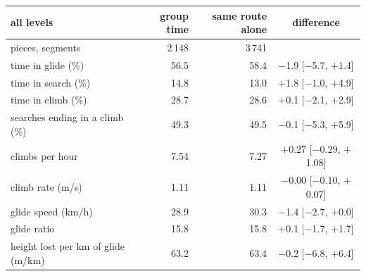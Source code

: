 \begin{tabular}{@{}l r r c@{}}
\toprule
all levels & group time & same route alone & difference \\
\midrule
pieces, segments & 2\,148 & 3\,741 & \\
time in glide (\%) & 56.5 & 58.4 & $-$1.9 [$-$5.7, $+$1.4] \\
time in search (\%) & 14.8 & 13.0 & $+$1.8 [$-$1.0, $+$4.9] \\
time in climb (\%) & 28.7 & 28.6 & $+$0.1 [$-$2.1, $+$2.9] \\
searches ending in a climb (\%) & 49.3 & 49.5 & $-$0.1 [$-$5.3, $+$5.9] \\
climbs per hour & 7.54 & 7.27 & $+$0.27 [$-$0.29, $+$1.08] \\
climb rate (m/s) & 1.11 & 1.11 & $-$0.00 [$-$0.10, $+$0.07] \\
glide speed (km/h) & 28.9 & 30.3 & $-$1.4 [$-$2.7, $+$0.0] \\
glide ratio & 15.8 & 15.8 & $+$0.1 [$-$1.7, $+$1.7] \\
height lost per km of glide (m/km) & 63.2 & 63.4 & $-$0.2 [$-$6.8, $+$6.4] \\
\bottomrule
\end{tabular}
